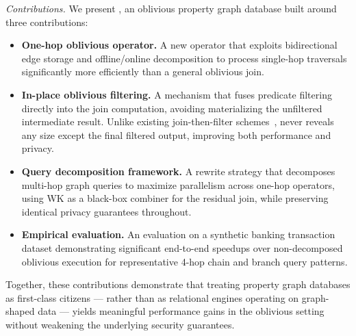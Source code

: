 \emph{Contributions.} We present \system, an oblivious property graph database 
built around three contributions:

\begin{itemize}
    \item \textbf{One-hop oblivious operator.} A new operator that exploits 
    bidirectional edge storage and offline/online decomposition to process 
    single-hop traversals significantly more efficiently than a general 
    oblivious join.

    \item \textbf{In-place oblivious filtering.} A mechanism that fuses 
    predicate filtering directly into the join computation, avoiding 
    materializing the unfiltered intermediate result. Unlike existing 
    join-then-filter schemes~\cite{ruidi2025oblivious, 
    mavrogiannakis2025obliviator}, \system never reveals any size except the 
    final filtered output, improving both performance and privacy.
    
    \item \textbf{Query decomposition framework.} A rewrite strategy that 
    decomposes multi-hop graph queries to maximize parallelism across one-hop 
    operators, using WK as a black-box combiner for the residual join, while 
    preserving identical privacy guarantees throughout.

    \item \textbf{Empirical evaluation.} An evaluation on a synthetic banking 
    transaction dataset demonstrating significant end-to-end speedups over 
    non-decomposed oblivious execution for representative 4-hop chain and 
    branch query patterns.
\end{itemize}

Together, these contributions demonstrate that treating property graph 
databases as first-class citizens --- rather than as relational engines 
operating on graph-shaped data --- yields meaningful performance gains in the 
oblivious setting without weakening the underlying security guarantees.